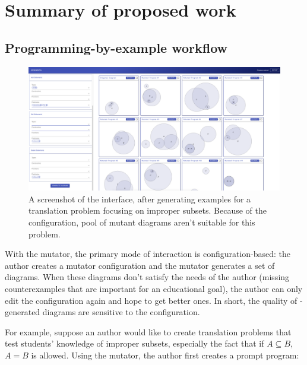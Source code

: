 
\section{Summary of proposed work}

\subsection{Programming-by-example workflow}


\begin{figure}
    \centering
    \includegraphics[width=\linewidth]{assets/appendix/edgeworth-bad-output.pdf}
    \caption{A screenshot of the \Edgeworth interface, after generating examples for a translation problem focusing on improper subsets. Because of the configuration, pool of mutant diagrams aren't suitable for this problem.}
    \label{fig:edgeworth-bad-output}
\end{figure}


With the \Edgeworth mutator, the primary mode of interaction is configuration-based: the author creates a mutator configuration and the mutator generates a set of diagrams. When these diagrams don't satisfy the needs of the author (\eg missing counterexamples that are important for an educational goal), the author can only edit the configuration again and hope to get better ones. In short, the quality of \Edgeworth-generated diagrams are sensitive to the configuration. 

For example, suppose an author would like to create translation problems that test students' knowledge of improper subsets, especially the fact that if $A \subseteq B$, $A = B$ is allowed. Using the \Edgeworth mutator, the author first creates a prompt \Substance program:

